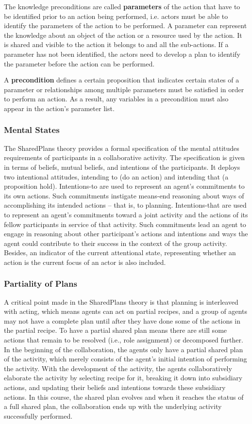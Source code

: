 The knowledge preconditions are called \textbf{parameters} of the action that have to be identified prior to an action being performed, i.e. actors must be able to identify the parameters of the action to be performed. A parameter can represent the knowledge about an object of the action or a resource used by the action. It is shared and visible to the action it belongs to and all the sub-actions. If a parameter has not been identified, the actors need to develop a plan to identify the parameter before the action can be performed.

A \textbf{precondition} defines a certain proposition that indicates certain states of a parameter or relationships among multiple parameters must be satisfied in order to perform an action. As a result, any variables in a precondition must also appear in the action's parameter list. 

\subsubsection*{Mental States}
The SharedPlans theory provides a formal specification of the mental attitudes requirements of participants in a collaborative activity. The specification is given in terms of beliefs, mutual beliefs, and intentions of the participants. It deploys two intentional attitudes, intending to (do an action) and intending that (a proposition hold). Intentions-to are used to represent an agent’s commitments to its own actions. Such commitments instigate means-end reasoning about ways of accomplishing its intended actions – that is, to planning. Intentions-that are used to represent an agent’s commitments toward a joint activity and the actions of its fellow participants in service of that activity. Such commitments lead an agent to engage in reasoning about other participant’s actions and intentions and ways the agent could contribute to their success in the context of the group activity. Besides, an indicator of the current attentional state, representing whether an action is the current focus of an actor is also included. 

\subsubsection*{Partiality of Plans}
A critical point made in the SharedPlans theory is that planning is interleaved with acting, which means agents can act on partial recipes, and a group of agents may not have a complete plan until after they have done some of the actions in the partial recipe. To have a partial shared plan means there are still some actions that remain to be resolved (i.e., role assignment) or decomposed further. In the beginning of the collaboration, the agents only have a partial shared plan of the activity, which merely consists of the agent’s initial intention of performing the activity. With the development of the activity, the agents collaboratively elaborate the activity by selecting recipe for it, breaking it down into subsidiary actions, and updating their beliefs and intentions towards these subsidiary actions. In this course, the shared plan evolves and when it reaches the status of a full shared plan, the collaboration ends up with the underlying activity successfully performed.

